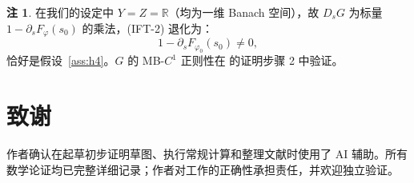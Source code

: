 \documentclass[12pt,a4paper]{article}
\theoremstyle{definition}
\newtheorem{remark}[theorem]{注}
\newcommand{\R}{\mathbb{R}}
\begin{document}
\begin{remark}
在我们的设定中 $Y = Z = \R$（均为一维 Banach 空间），故 $D_s G$ 为标量 $1 - \partial_s F_\varphi(s_0)$ 的乘法，(IFT-2) 退化为：
\[ 1 - \partial_s F_{\varphi_0}(s_0) \neq 0, \]
恰好是假设~\ref{ass:h4}。$G$ 的 MB-$C^1$ 正则性在 的证明步骤 2 中验证。
\end{remark}

\section*{致谢}

作者确认在起草初步证明草图、执行常规计算和整理文献时使用了 AI 辅助。所有数学论证均已完整详细记录；作者对工作的正确性承担责任，并欢迎独立验证。
\end{document}
